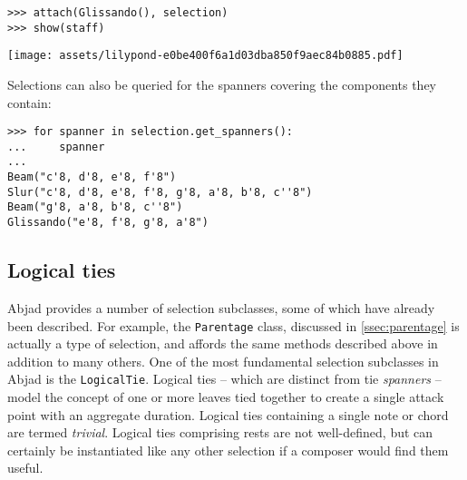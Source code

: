 \begin{comment}
<abjad>
attach(Glissando(), selection)
show(staff)
</abjad>
\end{comment}

\begin{abjadbookoutput}
\begin{singlespacing}
\vspace{-0.5\baselineskip}
\begin{verbatim}
>>> attach(Glissando(), selection)
>>> show(staff)
\end{verbatim}
\noindent\texttt{[image: assets/lilypond-e0be400f6a1d03dba850f9aec84b0885.pdf]}
\end{singlespacing}
\end{abjadbookoutput}

\noindent Selections can also be queried for the spanners covering the
components they contain:

\begin{comment}
<abjad>
for spanner in selection.get_spanners():
    spanner

</abjad>
\end{comment}

\begin{abjadbookoutput}
\begin{singlespacing}
\vspace{-0.5\baselineskip}
\begin{verbatim}
>>> for spanner in selection.get_spanners():
...     spanner
...
Beam("c'8, d'8, e'8, f'8")
Slur("c'8, d'8, e'8, f'8, g'8, a'8, b'8, c''8")
Beam("g'8, a'8, b'8, c''8")
Glissando("e'8, f'8, g'8, a'8")
\end{verbatim}
\end{singlespacing}
\end{abjadbookoutput}

\subsection{Logical ties}
\label{ssec:logical-ties}

Abjad provides a number of selection subclasses, some of which have already
been described. For example, the \texttt{Parentage} class, discussed in
\autoref{ssec:parentage} is actually a type of selection, and affords the same
methods described above in addition to many others. One of the most fundamental
selection subclasses in Abjad is the \texttt{LogicalTie}. Logical ties -- which
are distinct from tie \emph{spanners} -- model the concept of one or more
leaves tied together to create a single attack point with an aggregate
duration. Logical ties containing a single note or chord are termed
\emph{trivial}. Logical ties comprising rests are not well-defined, but can
certainly be instantiated like any other selection if a composer would find
them useful.

